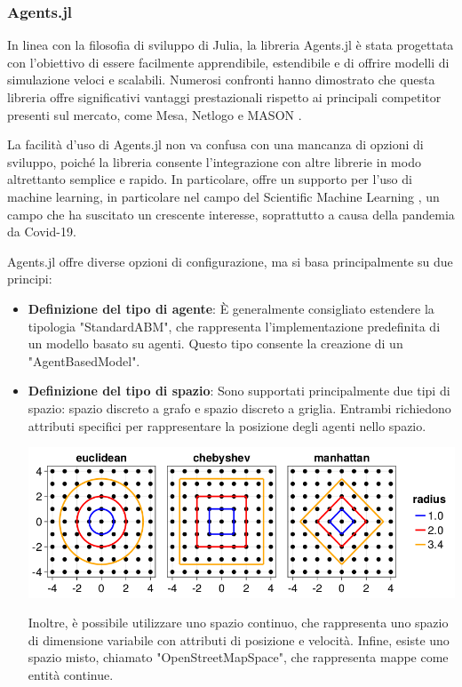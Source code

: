\subsubsection{Agents.jl}

In linea con la filosofia di sviluppo di Julia, la libreria Agents.jl 
\cite{Agents.jl} è stata progettata con l'obiettivo di essere facilmente 
apprendibile, estendibile e di offrire modelli di simulazione veloci e 
scalabili. Numerosi confronti hanno dimostrato che questa libreria offre 
significativi vantaggi prestazionali rispetto ai principali competitor 
presenti sul mercato, come Mesa, Netlogo e MASON \cite{ABAR201713}.

La facilità d'uso di Agents.jl non va confusa con una mancanza di opzioni 
di sviluppo, poiché la libreria consente l'integrazione con altre 
librerie in modo altrettanto semplice e rapido. In particolare, offre un 
supporto per l'uso di machine learning, in particolare nel campo del 
Scientific Machine Learning \cite{rackauckas2017differentialequations}, 
un campo che ha suscitato un crescente interesse, soprattutto a 
causa della pandemia da Covid-19.

Agents.jl offre diverse opzioni di configurazione, ma si basa principalmente su due principi:

\begin{itemize}
    \item \textbf{Definizione del tipo di agente}: È generalmente 
    consigliato estendere la tipologia "StandardABM", che rappresenta 
    l'implementazione predefinita di un modello basato su agenti. 
    Questo tipo consente la creazione di un "AgentBasedModel".
    \item \textbf{Definizione del tipo di spazio}: Sono supportati 
    principalmente due tipi di spazio: spazio discreto a grafo 
    \cite{Graphs2021} e spazio discreto a griglia. Entrambi 
    richiedono attributi specifici per rappresentare la posizione degli 
    agenti nello spazio.
    
    \begin{minipage}{\linewidth}
        \centering
        \includegraphics[width=\textwidth]{img/distance.png}
        \label{fig:gridspace_distances}
    \end{minipage}

    Inoltre, è possibile utilizzare uno spazio continuo, che 
    rappresenta uno spazio di dimensione variabile con attributi di 
    posizione e velocità. Infine, esiste uno spazio misto, chiamato 
    "OpenStreetMapSpace", che rappresenta mappe come entità continue.
\end{itemize}

